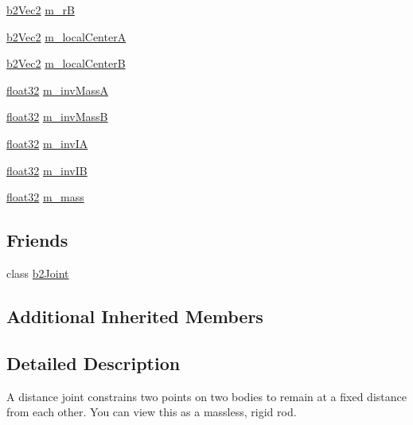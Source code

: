 \begin{DoxyCompactItemize}
\item 
\mbox{\hyperlink{structb2_vec2}{b2\+Vec2}} \mbox{\hyperlink{classb2_distance_joint_a70eab22cb7abeb825744f5dc3befa63a}{m\+\_\+rB}}
\item 
\mbox{\hyperlink{structb2_vec2}{b2\+Vec2}} \mbox{\hyperlink{classb2_distance_joint_a5793083e9ef396cf7a89d84481fe1308}{m\+\_\+local\+CenterA}}
\item 
\mbox{\hyperlink{structb2_vec2}{b2\+Vec2}} \mbox{\hyperlink{classb2_distance_joint_a4fa600dec301992ad1f23aaf25d592a5}{m\+\_\+local\+CenterB}}
\item 
\mbox{\hyperlink{b2_settings_8h_aacdc525d6f7bddb3ae95d5c311bd06a1}{float32}} \mbox{\hyperlink{classb2_distance_joint_a2564d44d59b589591a4214390617cc4e}{m\+\_\+inv\+MassA}}
\item 
\mbox{\hyperlink{b2_settings_8h_aacdc525d6f7bddb3ae95d5c311bd06a1}{float32}} \mbox{\hyperlink{classb2_distance_joint_aeaea63222b01f95c71da5719feca4cbc}{m\+\_\+inv\+MassB}}
\item 
\mbox{\hyperlink{b2_settings_8h_aacdc525d6f7bddb3ae95d5c311bd06a1}{float32}} \mbox{\hyperlink{classb2_distance_joint_a9e9edc41d2bf14189a3eaeb19995b93a}{m\+\_\+inv\+IA}}
\item 
\mbox{\hyperlink{b2_settings_8h_aacdc525d6f7bddb3ae95d5c311bd06a1}{float32}} \mbox{\hyperlink{classb2_distance_joint_a250b46aa3fc17a363a6af9af5749ce1c}{m\+\_\+inv\+IB}}
\item 
\mbox{\hyperlink{b2_settings_8h_aacdc525d6f7bddb3ae95d5c311bd06a1}{float32}} \mbox{\hyperlink{classb2_distance_joint_aee25a31b1096e91b55a29731cf67d99d}{m\+\_\+mass}}
\end{DoxyCompactItemize}
\subsection*{Friends}
\begin{DoxyCompactItemize}
\item 
class \mbox{\hyperlink{classb2_distance_joint_a54ade8ed3d794298108d7f4c4e4793fa}{b2\+Joint}}
\end{DoxyCompactItemize}
\subsection*{Additional Inherited Members}


\subsection{Detailed Description}
A distance joint constrains two points on two bodies to remain at a fixed distance from each other. You can view this as a massless, rigid rod. 

